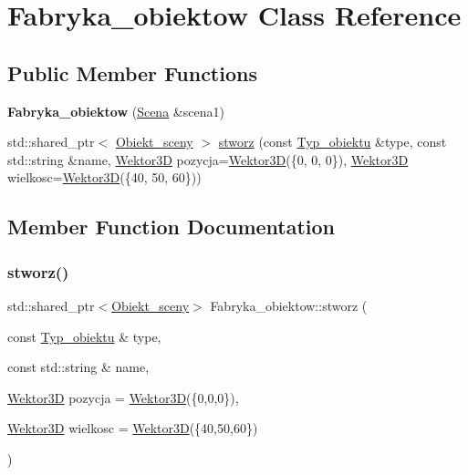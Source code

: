\hypertarget{class_fabryka__obiektow}{}\section{Fabryka\+\_\+obiektow Class Reference}
\label{class_fabryka__obiektow}
\subsection*{Public Member Functions}
\begin{DoxyCompactItemize}
\item 
\mbox{\label{class_fabryka__obiektow_ad5e30259d9aa1f9f75e2d84147b6874b}} 
{\bfseries Fabryka\+\_\+obiektow} (\mbox{\hyperlink{class_scena}{Scena}} \&scena1)
\item 
std\+::shared\+\_\+ptr$<$ \mbox{\hyperlink{class_obiekt__sceny}{Obiekt\+\_\+sceny}} $>$ \mbox{\hyperlink{class_fabryka__obiektow_a83c2a8497c9b3e6b7870a10fa3478188}{stworz}} (const \mbox{\hyperlink{_fabryka__obiektow_8hh_a9501853a2db8f8cc2c341b021578862c}{Typ\+\_\+obiektu}} \&type, const std\+::string \&name, \mbox{\hyperlink{class_wektor}{Wektor3D}} pozycja=\mbox{\hyperlink{class_wektor}{Wektor3D}}(\{0, 0, 0\}), \mbox{\hyperlink{class_wektor}{Wektor3D}} wielkosc=\mbox{\hyperlink{class_wektor}{Wektor3D}}(\{40, 50, 60\}))
\end{DoxyCompactItemize}


\subsection{Member Function Documentation}
\mbox{\label{class_fabryka__obiektow_a83c2a8497c9b3e6b7870a10fa3478188}} 
\subsubsection{\texorpdfstring{stworz()}{stworz()}}
{\footnotesize\ttfamily std\+::shared\+\_\+ptr$<$\mbox{\hyperlink{class_obiekt__sceny}{Obiekt\+\_\+sceny}}$>$ Fabryka\+\_\+obiektow\+::stworz (\begin{DoxyParamCaption}\item[{const \mbox{\hyperlink{_fabryka__obiektow_8hh_a9501853a2db8f8cc2c341b021578862c}{Typ\+\_\+obiektu}} \&}]{type,  }\item[{const std\+::string \&}]{name,  }\item[{\mbox{\hyperlink{class_wektor}{Wektor3D}}}]{pozycja = {\ttfamily \mbox{\hyperlink{class_wektor}{Wektor3D}}(\{0,0,0\})},  }\item[{\mbox{\hyperlink{class_wektor}{Wektor3D}}}]{wielkosc = {\ttfamily \mbox{\hyperlink{class_wektor}{Wektor3D}}(\{40,50,60\})} }\end{DoxyParamCaption})\hspace{0.3cm}{\ttfamily [inline]}}

